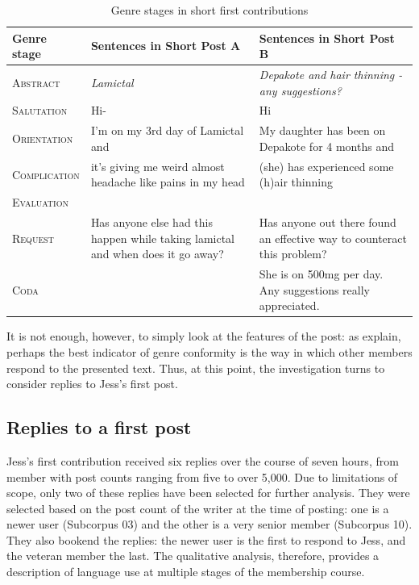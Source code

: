 \documentclass{article}
\begin{document}
\begin{table}[htb]
\small\centering
\begin{tabularx}{\textwidth}{lXX}
\toprule
Genre stage  & Sentences in Short Post A  & Sentences in Short Post B \\ \midrule
\textsc{Abstract}     & \emph{Lamictal}  & \emph{Depakote and hair thinning - any suggestions?}  \\
\textsc{Salutation}   & Hi-                                                                              & Hi                                                                      \\
\textsc{Orientation}  & I'm on my 3rd day of Lamictal and                                                & My daughter has been on Depakote for 4 months and                       \\
\textsc{Complication} & it's giving me weird almost headache like pains in my head                       & (she) has experienced some (h)air thinning                              \\
\textsc{Evaluation}   & ~                                                                                & ~                                                                       \\
\textsc{Request }     & Has anyone else had this happen while taking lamictal and when does it go away? & Has anyone out there found an effective way to counteract this problem? \\
\textsc{Coda}         & ~                                                                                & She is on 500mg per day. Any suggestions really appreciated.            \\
\bottomrule
\end{tabularx}
\caption{Genre stages in short first contributions}
\label{tab:two-genre-stage-analyses}
\end{table}
%
It is not enough, however, to simply look at the features of the post: as \textcite{eggins_analysing_2004} explain, perhaps the best indicator of genre conformity is the way in which other members respond to the presented text. Thus, at this point, the investigation turns to consider replies to Jess's first post.

\subsection{Replies to a first post}

Jess's first contribution received six replies over the course of seven hours, from member with post counts ranging from five to over 5,000. Due to limitations of scope, only two of these replies have been selected for further analysis. They were selected based on the post count of the writer at the time of posting: one is a newer user (Subcorpus 03) and the other is a very senior member (Subcorpus 10). They also bookend the replies: the newer user is the first to respond to Jess, and the veteran member the last. The qualitative analysis, therefore, provides a description of language use at multiple stages of the membership course. %
\end{document}
